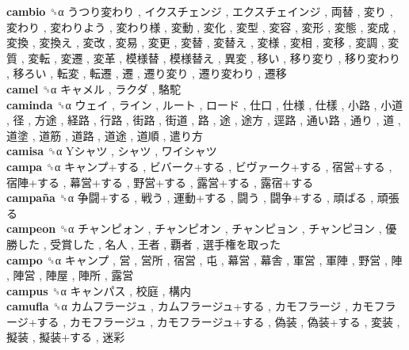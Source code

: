 \textbf{cambio} ␝α   うつり変わり ,  イクスチェンジ ,  エクスチェインジ ,  両替 ,  変り ,  変わり ,  変わりよう ,  変わり様 ,  変動 ,  変化 ,  変型 ,  変容 ,  変形 ,  変態 ,  変成 ,  変換 ,  変換え ,  変改 ,  変易 ,  変更 ,  変替 ,  変替え ,  変様 ,  変相 ,  変移 ,  変調 ,  変質 ,  変転 ,  変遷 ,  変革 ,  模様替 ,  模様替え ,  異変 ,  移い ,  移り変り ,  移り変わり ,  移ろい ,  転変 ,  転遷 ,  遷 ,  遷り変り ,  遷り変わり ,  遷移   \\
\textbf{camel} ␝α   キャメル ,  ラクダ ,  駱駝   \\
\textbf{caminda} ␝α   ウェイ ,  ライン ,  ルート ,  ロード ,  仕口 ,  仕様 ,  仕樣 ,  小路 ,  小道 ,  径 ,  方途 ,  経路 ,  行路 ,  街路 ,  街道 ,  路 ,  途 ,  途方 ,  逕路 ,  通い路 ,  通り ,  道 ,  道塗 ,  道筋 ,  道路 ,  道途 ,  道順 ,  遣り方   \\
\textbf{camisa} ␝α   Yシャツ ,  シャツ ,  ワイシャツ   \\
\textbf{campa} ␝α   キャンプ+する ,  ビバーク+する ,  ビヴァーク+する ,  宿営+する ,  宿陣+する ,  幕営+する ,  野営+する ,  露営+する ,  露宿+する   \\
\textbf{campaña} ␝α   争闘+する ,  戦う ,  運動+する ,  闘う ,  闘争+する ,  頑ばる ,  頑張る   \\
\textbf{campeon} ␝α   チャンピォン ,  チャンピオン ,  チャンピョン ,  チャンピヨン ,  優勝した ,  受賞した ,  名人 ,  王者 ,  覇者 ,  選手権を取った   \\
\textbf{campo} ␝α   キャンプ ,  営 ,  営所 ,  宿営 ,  屯 ,  幕営 ,  幕舎 ,  軍営 ,  軍陣 ,  野営 ,  陣 ,  陣営 ,  陣屋 ,  陣所 ,  露営   \\
\textbf{campus} ␝α   キャンパス ,  校庭 ,  構内   \\
\textbf{camufla} ␝α   カムフラージュ ,  カムフラージュ+する ,  カモフラージ ,  カモフラージ+する ,  カモフラージュ ,  カモフラージュ+する ,  偽装 ,  偽装+する ,  変装 ,  擬装 ,  擬装+する ,  迷彩   \\
